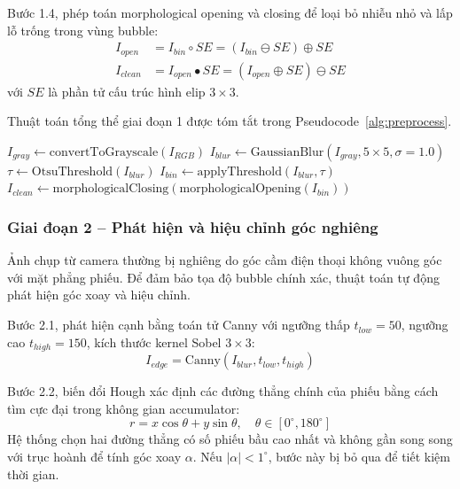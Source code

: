 ﻿\documentclass[../DoAn.tex]{subfiles}
\begin{document}
Bước 1.4, phép toán morphological opening và closing để loại bỏ nhiễu nhỏ và lấp lỗ trống trong vùng bubble:
\begin{align}
    I_{open} &= I_{bin} \circ SE = (I_{bin} \ominus SE) \oplus SE \\
    I_{clean} &= I_{open} \bullet SE = (I_{open} \oplus SE) \ominus SE
\end{align}
với $SE$ là phần tử cấu trúc hình elip $3 \times 3$.

Thuật toán tổng thể giai đoạn 1 được tóm tắt trong Pseudocode~\ref{alg:preprocess}.

\begin{algorithm}[H]
\caption{Tiền xử lý ảnh OMR}
\label{alg:preprocess}
\SetAlgoLined
{}
 $I_{gray} \gets \text{convertToGrayscale}(I_{RGB})$ \;
 $I_{blur} \gets \text{GaussianBlur}(I_{gray}, 5 \times 5, \sigma=1.0)$ \;
 $\tau \gets \text{OtsuThreshold}(I_{blur})$ \;
 $I_{bin} \gets \text{applyThreshold}(I_{blur}, \tau)$ \;
 $I_{clean} \gets \text{morphologicalClosing}(\text{morphologicalOpening}(I_{bin}))$ \;
  \;
\end{algorithm}

\subsubsection{Giai đoạn 2 -- Phát hiện và hiệu chỉnh góc nghiêng}
Ảnh chụp từ camera thường bị nghiêng do góc cầm điện thoại không vuông góc với mặt phẳng phiếu. Để đảm bảo tọa độ bubble chính xác, thuật toán tự động phát hiện góc xoay và hiệu chỉnh.

Bước 2.1, phát hiện cạnh bằng toán tử Canny với ngưỡng thấp $t_{low}=50$, ngưỡng cao $t_{high}=150$, kích thước kernel Sobel $3 \times 3$:
\begin{equation}
    I_{edge} = \text{Canny}(I_{blur}, t_{low}, t_{high})
\end{equation}

Bước 2.2, biến đổi Hough xác định các đường thẳng chính của phiếu bằng cách tìm cực đại trong không gian accumulator:
\begin{equation}
    r = x \cos\theta + y \sin\theta, \quad \theta \in [0^\circ, 180^\circ]
\end{equation}
Hệ thống chọn hai đường thẳng có số phiếu bầu cao nhất và không gần song song với trục hoành để tính góc xoay $\alpha$. Nếu $|\alpha| < 1^\circ$, bước này bị bỏ qua để tiết kiệm thời gian.
\end{document}
